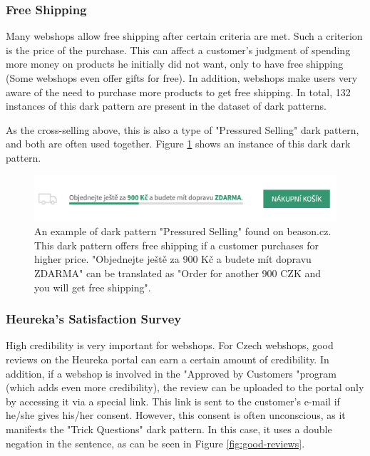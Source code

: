     \subsubsection*{Free Shipping}
    Many webshops allow free shipping after certain criteria are met. Such a criterion is the price of the purchase. This can affect a customer's judgment of spending more money on products he initially did not want, only to have free shipping (Some webshops even offer gifts for free). In addition, webshops make users very aware of the need to purchase more products to get free shipping. In total, 132 instances of this dark pattern are present in the dataset of dark patterns.

    As the cross-selling above, this is also a type of "Pressured Selling" dark pattern, and both are often used together. Figure \ref{fig:free-shipping} shows an instance of this dark dark pattern.

    \begin{figure}[ht]
        \centering
        \includegraphics[width=1\linewidth]{media/beason.cz-free-shipping.png}
        \caption{An example of dark pattern "Pressured Selling" found on beason.cz. This dark pattern offers free shipping if a customer purchases for higher price. "Objednejte ještě za 900 Kč a budete mít dopravu ZDARMA" can be translated as "Order for another 900 CZK and you will get free shipping".}
        \label{fig:free-shipping}
    \end{figure}

    \subsubsection*{Heureka's Satisfaction Survey}
    High credibility is very important for webshops\cite{good-reviews}. For Czech webshops, good reviews on the Heureka portal can earn a certain amount of credibility. In addition, if a webshop is involved in the "Approved by Customers "program (which adds even more credibility), the review can be uploaded to the portal only by accessing it via a special link. This link is sent to the customer's e-mail if he/she gives his/her consent. However, this consent is often unconscious, as it manifests the "Trick Questions" dark pattern. In this case, it uses a double negation in the sentence, as can be seen in Figure \ref{fig:good-reviews}.
    
